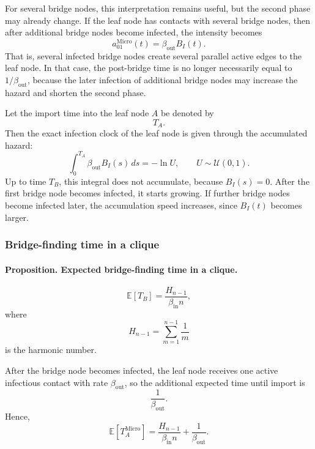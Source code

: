 \documentclass[a4paper,fleqn]{cas-sc}
\newcommand{\ReadStatusTwo}[5]{}
\begin{document}
For several bridge nodes, this interpretation remains useful, but the second phase may already change. If the leaf node has contacts with several bridge nodes, then after additional bridge nodes become infected, the intensity becomes
\[
a_{01}^{\mathrm{Micro}}(t)=\beta_{\mathrm{out}}B_I(t).
\]
That is, several infected bridge nodes create several parallel active edges to the leaf node. In that case, the post-bridge time is no longer necessarily equal to \(1/\beta_{\mathrm{out}}\), because the later infection of additional bridge nodes may increase the hazard and shorten the second phase.

Let the import time into the leaf node \(A\) be denoted by
\[
T_A.
\]
Then the exact infection clock of the leaf node is given through the accumulated hazard:
\[
\int_0^{T_A}
\beta_{\mathrm{out}}B_I(s)\,ds
=
-\ln U,
\qquad
U\sim\mathcal{U}(0,1).
\]
Up to time \(T_B\), this integral does not accumulate, because \(B_I(s)=0\). After the first bridge node becomes infected, it starts growing. If further bridge nodes become infected later, the accumulation speed increases, since \(B_I(t)\) becomes larger.

\subsubsection{Bridge-finding time in a clique}
\ReadStatusTwo{Bridge-finding time in a clique}{Yulian}{1}{Michael}{0}

\paragraph{Proposition. Expected bridge-finding time in a clique.}
\[
\mathbb{E}[T_B]
=
\frac{H_{n-1}}{\beta_{\mathrm{in}} n},
\]
where
\[
H_{n-1}
=
\sum_{m=1}^{n-1}\frac{1}{m}
\]
is the harmonic number.

After the bridge node becomes infected, the leaf node receives one active infectious contact with rate \(\beta_{\mathrm{out}}\), so the additional expected time until import is
\[
\frac{1}{\beta_{\mathrm{out}}}.
\]
Hence,
\[
\mathbb{E}[T_A^{\mathrm{Micro}}]
=
\frac{H_{n-1}}{\beta_{\mathrm{in}} n}
+
\frac{1}{\beta_{\mathrm{out}}}.
\]
\end{document}
